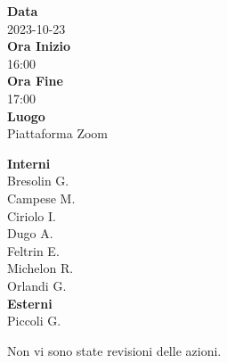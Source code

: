 \documentclass{article}
\begin{document}
\setlength{\columnsep}{2.2em}
\setlength{\columnseprule}{4pt}
\begin{paracol}{2}


\textbf{Data} \\
2023-10-23\\

\textbf{Ora Inizio} \\
16:00\\

\textbf{Ora Fine} \\
17:00\\

\textbf{Luogo} \\
Piattaforma Zoom

\vspace{12.6em}


\textbf{Interni} \\
Bresolin G.\\
Campese M.\\
Ciriolo I.\\
Dugo A.\\
Feltrin E.\\
Michelon R.\\
Orlandi G.\\

\textbf{Esterni} \\
Piccoli G.\\


\switchcolumn



\begin{enumerate}
Non vi sono state revisioni delle azioni.
\end{enumerate}


\end{paracol}
\end{document}
